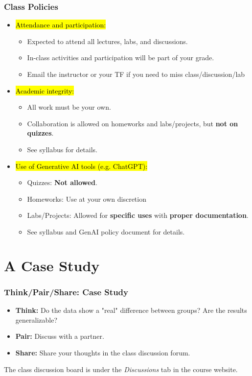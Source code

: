 \documentclass[slidestop,compress,mathserif]{beamer}
\begin{document}
\begin{frame}
	\frametitle{Class Policies} 
	\begin{itemize}
		\item \hl{Attendance and participation:} 
		\begin{itemize}
			\item Expected to attend all lectures, labs, and discussions. 
			\item In-class activities and participation will be part of your grade.
			\item Email the instructor or your TF if you need to miss class/discussion/lab
		\end{itemize}
		\item \hl{Academic integrity:} 
		\begin{itemize}
			\item All work must be your own. 
			\item Collaboration is allowed on homeworks and labs/projects, but \textbf{not on quizzes}. 
			\item See syllabus for details.
		\end{itemize}
		\item \hl{Use of Generative AI tools (e.g. ChatGPT):}
		\begin{itemize}
			\item Quizzes: \textbf{Not allowed}.
			\item Homeworks: Use at your own discretion
			\item Labs/Projects: Allowed for \textbf{specific uses} with \textbf{proper documentation}.
			\item See syllabus and GenAI policy document for details.
		\end{itemize}
	\end{itemize}
\end{frame}


\section{A Case Study}


\begin{frame}
	\frametitle{Think/Pair/Share: Case Study}
	\begin{itemize}
		\item \textbf{Think:} Do the data show a "real" difference between groups? Are the results generalizable?
		\item \textbf{Pair:} Discuss with a partner.
		\item \textbf{Share:} Share your thoughts in the class discussion forum.
	\end{itemize}

	The class discussion board is under the \textit{Discussions} tab in the course website. %
\end{frame}
\end{document}
